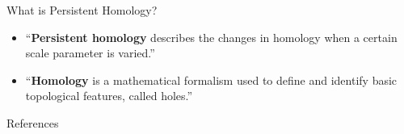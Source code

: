 






\begin{frame}
    \titlepage
\end{frame}



\begin{frame}{What is Persistent Homology?}
		\begin{itemize}[<+->]
			\item ``\textbf{Persistent homology} describes the changes in homology when a certain scale parameter is varied.''
			\item ``\textbf{Homology} is a mathematical formalism used to deﬁne and identify basic topological features, called holes.''
		\end{itemize}
		\begin{figure}[]
			\centering
			\caption{\cite{dey}}
		\end{figure}
\end{frame}



\begin{frame}{References}
	\nocite{wagner}
	
\end{frame}





